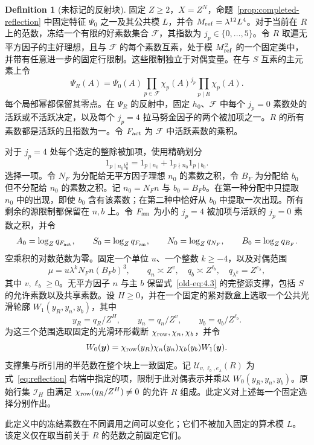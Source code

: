 \documentclass[11pt,a4paper]{article}
\numberwithin{equation}{section}
\numberwithin{figure}{section}
\theoremstyle{definition}
\newtheorem{definition}[theorem]{Definition}
\theoremstyle{remark}
\begin{document}
\begin{definition}[未标记的反射块]
\label{def:unmarked-reflected-block}
固定 $Z\ge2$，$X=Z^N$，命题~\ref{prop:completed-reflection} 中固定特征 $\Psi_0$ 之一及其公共模 $L$，并令 $M_{\rm ref}=\lambda^{12}L^4$。对于当前在 $R$ 上的范数，冻结一个有限的好素数集合 $\mathcal F$，其指数为 $j_p\in\{0,\ldots,5\}$。令 $R$ 取遍无平方因子的主好理想，且与 $\mathcal F$ 的每个素数互素，处于模 $M_{\rm ref}^2$ 的一个固定类中，并带有任意进一步的固定行限制。这些限制独立于对偶变量。在与 $S$ 互素的主元素上令
\[
 \Psi_R(A)=\Psi_0(A)\prod_{p\in\mathcal F}\chi_p(A)^{j_p}
                         \prod_{p\mid R}\chi_p(A).
\]
每个局部幂都保留其零点。在 $\Psi_R$ 的反射中，固定 $h_0$、$\mathcal F$ 中每个 $j_p=0$ 素数处的活跃或不活跃决定，以及每个 $j_p=4$ 拉马努金因子的两个被加项之一。$R$ 的所有素数都是活跃的且指数为一。令 $F_{\rm act}$ 为 $\mathcal F$ 中活跃素数的乘积。

对于 $j_p=4$ 处每个选定的整除被加项，使用精确划分
\[
 1_{p\mid n_0b_0^3}=1_{p\mid n_0}+1_{p\nmid n_0}1_{p\mid b_0}.
\]
选择一项。令 $N_F$ 为分配给无平方因子理想 $n_0$ 的素数之积，令 $B_F$ 为分配给 $b_0$ 但不分配给 $n_0$ 的素数之积。记 $n_0=N_Fn$ 与 $b_0=B_Fb$。在第一种分配中只提取 $n_0$ 中的出现，即使 $b_0$ 含有该素数；在第二种中恰好从 $b_0$ 中提取一次出现。所有剩余的源限制都保留在 $n,b$ 上。令 $F_{\rm sm}$ 为小的 $j_p=4$ 被加项与活跃的 $j_p=0$ 素数之积，并令
\[
 A_0=\log_Zq_{F_{\rm act}},\qquad S_0=\log_Zq_{F_{\rm sm}},\qquad
 N_0=\log_Zq_{N_F},\qquad B_0=\log_Zq_{B_F}.
\]
空乘积的对数范数为零。固定一个单位 $u$、一个整数 $k\ge-4$，以及对偶范围
\[
 \mu=u\lambda^kN_Fn(B_Fb)^3,\qquad
 q_n\asymp Z^v,\quad q_b\asymp Z^{\ell_b},\quad
 q_{\lambda^k}=Z^{e_\lambda},
\]
其中 $v,\ell_b\ge0$。无平方因子 $n$ 与主 $b$ 保留式~\eqref{old-eq:4.3} 的完整源支撑，包括 $S$ 的允许素数以及共享素数。设 $H\ge0$，并在一个固定的紧对数盒上选取一个公共光滑轮廓 $W_1(y_R,y_n,y_b)$，其中
\[
 y_R=q_R/Z^H,\qquad y_n=q_n/Z^v,\qquad y_b=q_b/Z^{\ell_b}.
\]
为这三个范围选取固定的光滑环形截断 $\chi_{\rm row},\chi_n,\chi_b$，并令
\[
 W_0(\boldsymbol y)=\chi_{\rm row}(y_R)\chi_n(y_n)\chi_b(y_b)W_1(\boldsymbol y).
\]
支撑集与所引用的半范数在整个块上一致固定。记 $\mathcal U_{v,\ell_b,e_\lambda}(R)$ 为式~\eqref{eq:reflection} 右端中指定的项，限制于此对偶表示并乘以 $W_0(y_R,y_n,y_b)$。原始行集 $\mathcal I_H$ 由满足 $\chi_{\rm row}(q_R/Z^H)\ne0$ 的允许 $R$ 组成。此定义对上述每一个固定选择分别作出。
\end{definition}

此定义中的冻结素数在不同调用之间可以变化；它们不被加入固定的算术模 $L$。该定义仅在取当前关于 $R$ 的范数之前固定它们。
\end{document}
